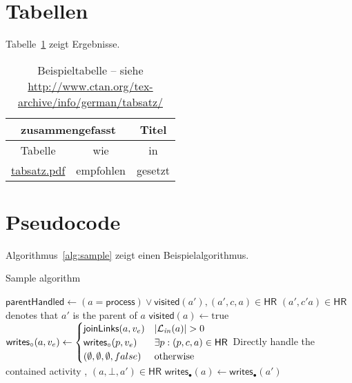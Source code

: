 \section{Tabellen}
Tabelle~\ref{tab:Ergebnisse} zeigt Ergebnisse.
\begin{table}
  \begin{center}
    \begin{tabular}{ccc}
	\toprule
	\multicolumn{2}{c}{\textbf{zusammengefasst}} & \textbf{Titel} \\ \midrule
	Tabelle & wie & in \\
	\url{tabsatz.pdf}& empfohlen & gesetzt\\
	\bottomrule
    \end{tabular}
    \caption[Beispieltabelle]{Beispieltabelle -- siehe \url{http://www.ctan.org/tex-archive/info/german/tabsatz/}}
    \label{tab:Ergebnisse}
  \end{center}
\end{table}

\section{Pseudocode}
Algorithmus~\vref{alg:sample} zeigt einen Beispielalgorithmus.
\begin{Algorithmus} %
\caption{Sample algorithm}
\label{alg:sample}
\begin{algorithmic}
\State $\mathsf{parentHandled} \gets (a = \mathsf{process}) \lor \mathsf{visited}(a'), (a',c,a) \in \mathsf{HR}$ 
\State \Comment $(a',c'a) \in \mathsf{HR}$ denotes that $a'$ is the parent of $a$
\State $\mathsf{visited}(a) \gets \text{true}$
\State $\mathsf{writes}_\circ(a,v_e) \gets
\begin{cases}
\mathsf{joinLinks}(a,v_e) & \left\lvert\mathcal{L}_\mathit{in}(a)\right\rvert > 0\\
\mathsf{writes}_\circ(p,v_e)
& \exists p: (p,c,a) \in \mathsf{HR}\\
(\emptyset, \emptyset, \emptyset, false) & \text{otherwise}
\end{cases}
$
  \State {}
  \State {}
 \Comment Directly handle the contained activity
  \State {}, $(a,\bot,a') \in \mathsf{HR}$
  \State $\mathsf{writes}_\bullet(a) \gets \mathsf{writes}_\bullet(a')$
\EndIf
{}
  \State {}
\EndFor
\EndIf
\EndProcedure
\end{algorithmic}
\end{Algorithmus}

